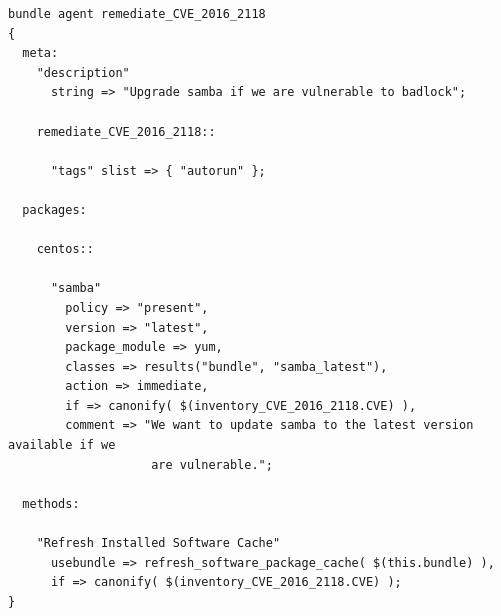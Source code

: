 \documentclass[11pt]{article}
\begin{document}
\begin{verbatim}
bundle agent remediate_CVE_2016_2118
{
  meta:
    "description"
      string => "Upgrade samba if we are vulnerable to badlock";

    remediate_CVE_2016_2118::

      "tags" slist => { "autorun" };

  packages:

    centos::

      "samba"
        policy => "present",
        version => "latest",
        package_module => yum,
        classes => results("bundle", "samba_latest"),
        action => immediate,
        if => canonify( $(inventory_CVE_2016_2118.CVE) ),
        comment => "We want to update samba to the latest version available if we
                    are vulnerable.";

  methods:

    "Refresh Installed Software Cache"
      usebundle => refresh_software_package_cache( $(this.bundle) ),
      if => canonify( $(inventory_CVE_2016_2118.CVE) );
}
\end{verbatim}
\end{document}
